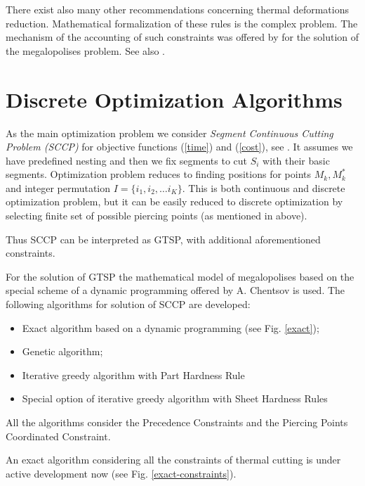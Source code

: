 \documentclass{../download/tPRS2e}
\begin{document}
There exist also many other recommendations concerning thermal deformations reduction.
Mathematical formalization of these rules is the complex problem.
The mechanism of the accounting of such constraints was offered by \cite{chentsov_dynamic_2013}
for the solution of the megalopolises problem. See also \cite{chentsov_model_2015}.

\section{Discrete Optimization Algorithms}

As the main optimization problem we consider
\textit{Segment Continuous Cutting Problem (SCCP)}
for objective functions (\ref{time}) and (\ref{cost}),
see \cite{petunin_local_2014}.
It assumes we have predefined nesting and then we fix segments to cut $S_i$
with their basic segments.
Optimization problem reduces to finding positions for points  $M_k, M^*_k$
and integer permutation $I = \{i_1, i_2, \dots i_K\}$.
This is both continuous and discrete optimization problem,
but it can be easily reduced to discrete optimization by selecting finite set of possible piercing points
(as mentioned in above).

Thus SCCP can be interpreted as GTSP, with additional aforementioned constraints.

For the solution of GTSP the mathematical model of megalopolises
based on the special scheme of a dynamic programming offered by A. Chentsov is used.
The following algorithms for solution of SCCP are developed:

\begin{itemize}
\item Exact algorithm based on a dynamic programming (see Fig. \ref{exact});
\item Genetic algorithm;
\item Iterative greedy algorithm with Part Hardness Rule
\item Special option of iterative greedy algorithm with Sheet Hardness Rules
\end{itemize}

All the algorithms consider the Precedence Constraints and the Piercing Points Coordinated Constraint.

An exact algorithm considering all the constraints of thermal cutting is under active development now
(see Fig. \ref{exact-constraints}).
\end{document}
